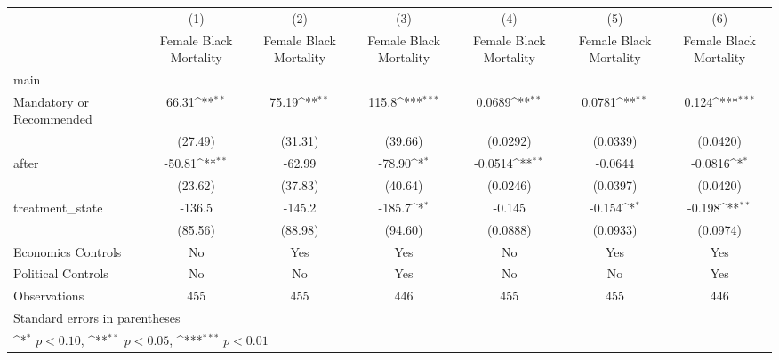 {
\def\sym#1{\ifmmode^{#1}\else\(^{#1}\)\fi}
\begin{longtable}{l*{6}{c}}
\hline\hline\endfirsthead\hline\endhead\hline\endfoot\endlastfoot
                    &\multicolumn{1}{c}{(1)}&\multicolumn{1}{c}{(2)}&\multicolumn{1}{c}{(3)}&\multicolumn{1}{c}{(4)}&\multicolumn{1}{c}{(5)}&\multicolumn{1}{c}{(6)}\\
                    &\multicolumn{1}{c}{Female Black Mortality}&\multicolumn{1}{c}{Female Black Mortality}&\multicolumn{1}{c}{Female Black Mortality}&\multicolumn{1}{c}{Female Black Mortality}&\multicolumn{1}{c}{Female Black Mortality}&\multicolumn{1}{c}{Female Black Mortality}\\
\hline
main                &                     &                     &                     &                     &                     &                     \\
Mandatory or Recommended&       66.31\sym{**} &       75.19\sym{**} &       115.8\sym{***}&      0.0689\sym{**} &      0.0781\sym{**} &       0.124\sym{***}\\
                    &     (27.49)         &     (31.31)         &     (39.66)         &    (0.0292)         &    (0.0339)         &    (0.0420)         \\
[1em]
after               &      -50.81\sym{**} &      -62.99         &      -78.90\sym{*}  &     -0.0514\sym{**} &     -0.0644         &     -0.0816\sym{*}  \\
                    &     (23.62)         &     (37.83)         &     (40.64)         &    (0.0246)         &    (0.0397)         &    (0.0420)         \\
[1em]
treatment\_state     &      -136.5         &      -145.2         &      -185.7\sym{*}  &      -0.145         &      -0.154\sym{*}  &      -0.198\sym{**} \\
                    &     (85.56)         &     (88.98)         &     (94.60)         &    (0.0888)         &    (0.0933)         &    (0.0974)         \\
[1em]
Economics Controls  &          No         &         Yes         &         Yes         &          No         &         Yes         &         Yes         \\
[1em]
Political Controls  &          No         &          No         &         Yes         &          No         &          No         &         Yes         \\
\hline
Observations        &         455         &         455         &         446         &         455         &         455         &         446         \\
\hline\hline
\multicolumn{7}{l}{\footnotesize Standard errors in parentheses}\\
\multicolumn{7}{l}{\footnotesize \sym{*} \(p<0.10\), \sym{**} \(p<0.05\), \sym{***} \(p<0.01\)}\\
\end{longtable}
}
